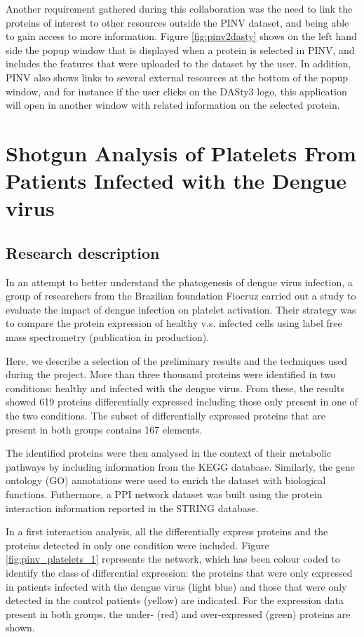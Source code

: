 Another requirement gathered during this collaboration was the need to link the proteins of interest to other resources outside the PINV dataset, and being able to gain access to more information. Figure \ref{fig:pinv2dasty} shows on the left hand side the popup window that is displayed when a protein is selected in PINV, and includes the features that were uploaded to the dataset by the user. In addition, PINV also shows links to several external resources at the bottom of the popup window, and for instance if the user clicks on the DASty3 logo, this application will open in another window with related information on the selected protein.


\section{Shotgun Analysis of Platelets From Patients Infected with the Dengue virus}
\label{sec:dengue}
\subsection{Research description}
In an attempt to better understand the phatogenesis of dengue virus infection, a group of researchers from the Brazilian foundation Fiocruz carried out a study to evaluate the impact of dengue infection on platelet activation. Their strategy was to compare the protein expression of healthy v.s. infected cells using label free mass spectrometry (publication in production).

Here, we describe a selection of the preliminary results and the techniques used during the project. More than three thousand proteins were identified in two conditions: healthy and infected with the dengue virus. From these, the results showed 619 proteins differentially expressed including those only present in one of the two conditions. The subset of differentially expressed proteins that are present in both groups contains 167 elements.

The identified proteins were then analysed in the context of their metabolic pathways by including information from the KEGG database. Similarly, the gene ontology (GO) annotations were used to enrich the dataset with biological functions.  Futhermore, a PPI network dataset was built using the protein interaction information reported in the STRING database.

In a first interaction analysis, all the differentially express proteins and the proteins detected in only one condition were included. Figure \ref{fig:pinv_platelets_1} represents the network, which has been colour coded to identify the class of differential expression: the proteins that were only expressed in patients infected with the dengue virus (light blue) and those that were only detected in the control patients (yellow) are indicated. For the expression data present in both groups, the under- (red) and over-expressed (green) proteins are shown.  

